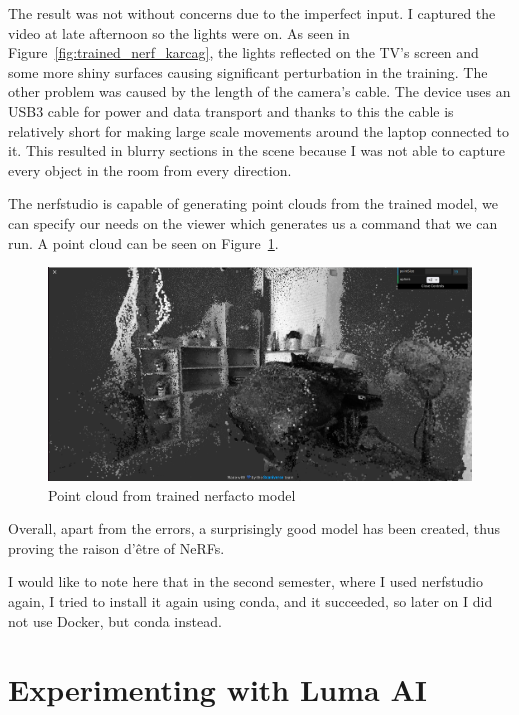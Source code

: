 The result was not without concerns due to the imperfect input. I captured the video at late afternoon so the lights were on. As seen in Figure~\ref{fig:trained_nerf_karcag}, the lights reflected on the TV's screen and some more shiny surfaces causing significant perturbation in the training. The other problem was caused by the length of the camera's cable. The device uses an USB3 cable for power and data transport and thanks to this the cable is relatively short for making large scale movements around the laptop connected to it. This resulted in blurry sections in the scene because I was not able to capture every object in the room from every direction.

The nerfstudio is capable of generating point clouds from the trained model, we can specify our needs on the viewer which generates us a command that we can run. A point cloud can be seen on Figure~\ref{fig:nerfstudio_point_cloud}.

\begin{figure}[htbp]
	\centering
	\includegraphics[width=150mm, keepaspectratio]{figures/nerfacto_point_cloud1.png}
	\caption{Point cloud from trained nerfacto model}
	\label{fig:nerfstudio_point_cloud}
\end{figure}

Overall, apart from the errors, a surprisingly good model has been created, thus proving the raison d'être of NeRFs.

I would like to note here that in the second semester, where I used nerfstudio again, I tried to install it again using conda, and it succeeded, so later on I did not use Docker, but conda instead.

\section{Experimenting with Luma AI}

